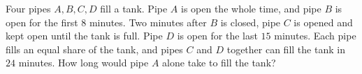 Four pipes $A,B,C,D$ fill a tank. Pipe $A$ is open the whole time, and pipe $B$ is open for the first $8$ minutes. Two minutes after $B$ is closed, pipe $C$ is opened and kept open until the tank is full. Pipe $D$ is open for the last $15$ minutes. Each pipe fills an equal share of the tank, and pipes $C$ and $D$ together can fill the tank in $24$ minutes. How long would pipe $A$ alone take to fill the tank?
